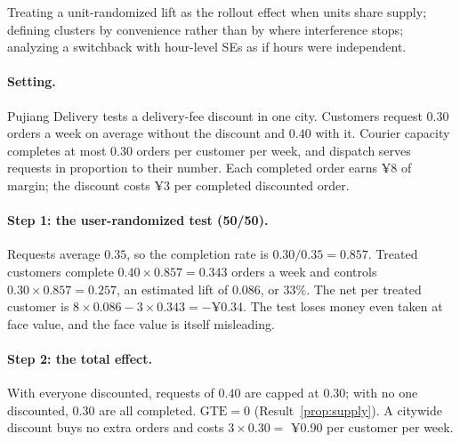 \documentclass[11pt]{article}
\begin{document}
\begin{pitfall}
Treating a unit-randomized lift as the rollout effect when units share supply; defining clusters by convenience
rather than by where interference stops; analyzing a switchback with hour-level SEs as if hours were independent.
\end{pitfall}

\sectiontwo

\paragraph{Setting.} Pujiang Delivery tests a delivery-fee discount in one city. Customers request $0.30$ orders a week on average
without the discount and $0.40$ with it. Courier capacity completes at most $0.30$ orders per customer per week, and
dispatch serves requests in proportion to their number. Each completed order earns ¥8 of margin; the discount costs
¥3 per completed discounted order.

\paragraph{Step 1: the user-randomized test (50/50).} Requests average $0.35$, so the completion rate is
$0.30/0.35 = 0.857$. Treated customers complete $0.40 \times 0.857 = 0.343$ orders a week and controls
$0.30 \times 0.857 = 0.257$, an estimated lift of $0.086$, or 33\%. The net per treated customer is
$8 \times 0.086 - 3 \times 0.343 = -$¥0.34. The test loses money even taken at face value, and the face value is itself
misleading.

\paragraph{Step 2: the total effect.} With everyone discounted, requests of $0.40$ are capped at $0.30$; with no one
discounted, $0.30$ are all completed. $\text{GTE} = 0$ (Result~\ref{prop:supply}). A citywide discount buys no extra
orders and costs $3 \times 0.30 = $ ¥0.90 per customer per week.
\end{document}
